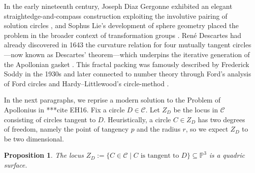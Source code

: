 \documentclass[11pt,a4paper]{article}
\newcommand{\PP}{\mathbb{P}}
\theoremstyle{mytheoremstyle}
\newtheorem{proposition}[theorem]{Proposition}
\theoremstyle{mydefinitionstyle}
\begin{document}
In the early nineteenth century, Joseph Diaz Gergonne exhibited an elegant straightedge-and-compass construction exploiting the involutive pairing of solution circles \cite[6]{Gergonne1814}, and Sophus Lie’s development of sphere geometry placed the problem in the broader context of transformation groups \cite[7]{Lie1897}.  René Descartes had already discovered in 1643 the curvature relation for four mutually tangent circles—now known as Descartes’ theorem—which underpins the iterative generation of the Apollonian gasket \cite[8]{Descartes1643}.  This fractal packing was famously described by Frederick Soddy in the 1930s \cite[9]{Soddy1936} and later connected to number theory through Ford’s analysis of Ford circles \cite[10]{Ford1938} and Hardy–Littlewood’s circle-method \cite[11]{HardyLittlewood1920}.

In the next paragraphs, we reprise a modern solution to the Problem of Apollonius in ***cite EH16. Fix a circle $D\in\mathcal{C}$. Let $Z_D$ be the locus in $\mathcal{C}$ consisting of circles tangent to $D$. Heuristically, a circle $C\in Z_D$ has two degrees of freedom, namely the point of tangency $p$ and the radius $r$, so we expect $Z_D$ to be two dimensional. 

\begin{proposition}
    The locus $Z_D:=\{C\in\mathcal{C}\mid C \text{ is tangent to } D\}\subseteq \PP^3$ is a quadric surface. 
\end{proposition}
\end{document}
